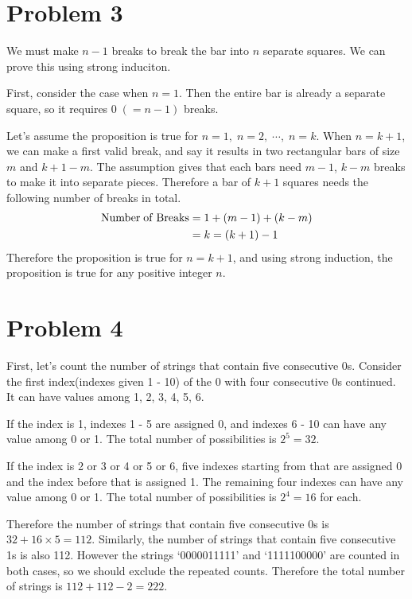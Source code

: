 \documentclass[10pt]{article}
\begin{document}
\section*{Problem 3}

We must make $n-1$ breaks to break the bar into $n$ separate squares. We can prove this using strong induciton.

\vspace{3mm}
First, consider the case when $n=1$. Then the entire bar is already a separate square, so it requires $0 \; (=n-1)$ breaks.

\vspace{3mm}
Let's assume the proposition is true for $n=1, \; n=2, \; \cdots , \; n=k$.
When $n=k+1$, we can make a first valid break, and say it results in two rectangular bars of size $m$ and $k+1-m$.
The assumption gives that each bars need $m-1$, $k-m$ breaks to make it into separate pieces.
Therefore a bar of $k+1$ squares needs the following number of breaks in total.
\begin{align*}
    {\rm Number \; of \; Breaks} &= 1 + (m-1) + (k-m) \\
    &= k = (k+1) - 1
\end{align*}
Therefore the proposition is true for $n=k+1$, and using strong induction, the proposition is true for any positive integer $n$.

\section*{Problem 4}

First, let's count the number of strings that contain five consecutive 0s.
Consider the first index(indexes given 1 - 10) of the 0 with four consecutive 0s continued.
It can have values among 1, 2, 3, 4, 5, 6.

\vspace{3mm}
If the index is 1, indexes 1 - 5 are assigned 0, and indexes 6 - 10 can have any value among 0 or 1.
The total number of possibilities is $2^5 = 32$.

\vspace{3mm}
If the index is 2 or 3 or 4 or 5 or 6, five indexes starting from that are assigned 0 and the index before that is assigned 1. The remaining four indexes can have any value among 0 or 1.
The total number of possibilities is $2^4 = 16$ for each.

\vspace{3mm}
Therefore the number of strings that contain five consecutive 0s is $32 + 16 \times 5 = 112$.
Similarly, the number of strings that contain five consecutive 1s is also 112.
However the strings `0000011111' and `1111100000' are counted in both cases, so we should exclude the repeated counts.
Therefore the total number of strings is $112 + 112 - 2 = 222$.
\end{document}
